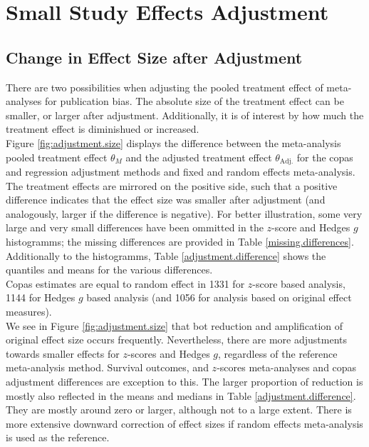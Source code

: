 \documentclass[11pt,a4paper,twoside]{book}\usepackage[]{graphicx}\usepackage[]{color}
\begin{document}
\section{Small Study Effects Adjustment}


\subsection{Change in Effect Size after Adjustment}

There are two possibilities when adjusting the pooled treatment effect of meta-analyses for publication bias. The absolute size of the treatment effect can be smaller, or larger after adjustment. Additionally, it is of interest by how much the treatment effect is diminishued or increased. \\
Figure \ref{fig:adjustment.size} displays the difference between the meta-analysis pooled treatment effect $\theta_M$ and the adjusted treatment effect $\theta_\textrm{Adj.}$ for the copas and regression adjustment methods and fixed and random effects meta-analysis. The treatment effects are mirrored on the positive side, such that a positive difference indicates that the effect size was smaller after adjustment (and analogously, larger if the difference is negative). For better illustration, some very large and very small differences have been ommitted in the $z$-score and Hedges $g$ histogramms; the missing differences are provided in Table \ref{missing.differences}. Additionally to the histogramms, Table \ref{adjustment.difference} shows the quantiles and means for the various differences.\\
Copas estimates are equal to random effect in 1331 for $z$-score based analysis, 1144 for Hedges $g$ based analysis (and 1056 for analysis based on original effect measures). \\
We see in Figure \ref{fig:adjustment.size} that bot reduction and amplification of original effect size occurs frequently. Nevertheless, there are more adjustments towards smaller effects for $z$-scores and Hedges $g$, regardless of the reference meta-analysis method. Survival outcomes, and $z$-scores meta-analyses and copas adjustment differences are exception to this. The larger proportion of reduction is mostly also reflected in the means and medians in Table \ref{adjustment.difference}. They are mostly around zero or larger, although not to a large extent. There is more extensive downward correction of effect sizes if random effects meta-analysis is used as the reference. 
\end{document}
